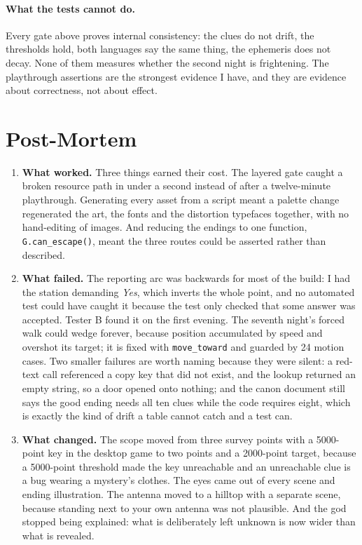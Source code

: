 \documentclass[12pt,a4paper]{article}
\begin{document}
\paragraph{What the tests cannot do.}
Every gate above proves internal consistency: the clues do not drift, the
thresholds hold, both languages say the same thing, the ephemeris does not decay.
None of them measures whether the second night is frightening. The playthrough
assertions are the strongest evidence I have, and they are evidence about
correctness, not about effect.

\section{Post-Mortem}

\begin{enumerate}
  \item \textbf{What worked.} Three things earned their cost. The layered gate
  caught a broken resource path in under a second instead of after a twelve-minute
  playthrough. Generating every asset from a script meant a palette change
  regenerated the art, the fonts and the distortion typefaces together, with no
  hand-editing of images. And reducing the endings to one function,
  \texttt{G.can\_escape()}, meant the three routes could be asserted rather than
  described.

  \item \textbf{What failed.} The reporting arc was backwards for most of the
  build: I had the station demanding \emph{Yes}, which inverts the whole point,
  and no automated test could have caught it because the test only checked that
  some answer was accepted. Tester B found it on the first evening. The seventh
  night's forced walk could wedge forever, because position accumulated by speed
  and overshot its target; it is fixed with \texttt{move\_toward} and guarded by
  24 motion cases. Two smaller failures are worth naming because they were silent:
  a red-text call referenced a copy key that did not exist, and the lookup returned
  an empty string, so a door opened onto nothing; and the canon document still says
  the good ending needs all ten clues while the code requires eight, which is
  exactly the kind of drift a table cannot catch and a test can.

  \item \textbf{What changed.} The scope moved from three survey points with a
  5000-point key in the desktop game to two points and a 2000-point target,
  because a 5000-point threshold made the key unreachable and an unreachable clue
  is a bug wearing a mystery's clothes. The eyes came out of every scene and
  ending illustration. The antenna moved to a hilltop with a separate scene,
  because standing next to your own antenna was not plausible. And the god stopped
  being explained: what is deliberately left unknown is now wider than what is
  revealed.


\end{enumerate}
\end{document}
